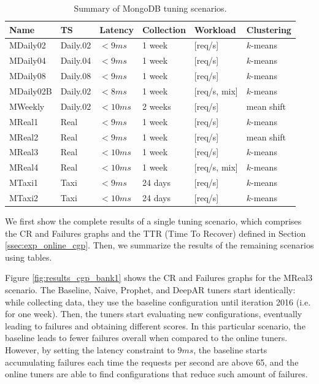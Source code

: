 \documentclass[a4paper, 12pt]{article} %
\newcommand{\ra}[1]{\renewcommand{\arraystretch}{#1}}
\begin{document}
	\begin{table}\centering 
		\ra{1.3}
		\begin{tabularx}{\textwidth}{@{}llllXX@{}}
			\midrule
			Name & TS & Latency & Collection & Workload & Clustering\\
			\midrule
			MDaily02&Daily.02 & $<9ms$  & 1 week & [req/s]  & $k$-means\\
			MDaily04&Daily.04 & $<9ms$  & 1 week & [req/s]  & $k$-means\\
			MDaily08&Daily.08 & $<9ms$  & 1 week & [req/s] & $k$-means\\
			MDaily02B&Daily.02 & $<8ms$  & 1 week & [req/s, mix] & $k$-means\\
			MWeekly&Daily.02 & $<10ms$  & 2 weeks & [req/s]  & mean shift\\
			MReal1&Real & $<9ms$  & 1 week & [req/s]  & $k$-means\\
			MReal2&Real & $<9ms$  & 1 week & [req/s]  & mean shift\\
			MReal3&Real & $<10ms$  & 1 week & [req/s]  & $k$-means\\
			MReal4&Real & $<10ms$  & 1 week & [req/s, mix]  & $k$-means\\
			MTaxi1 &Taxi & $<9ms$  & 24 days & [req/s]  & $k$-means\\
			MTaxi2 &Taxi & $<10ms$  & 24 days & [req/s]  & $k$-means\\
			
			\bottomrule
		\end{tabularx}
	\caption{Summary of MongoDB tuning scenarios. }  \label{table:results_tuning_scenarios}
	\end{table}
	
	We first show the complete results of a single tuning scenario, which comprises the CR and Failures graphs and the TTR (Time To Recover) defined in Section \ref{ssec:exp_online_cgp}. Then, we summarize the results of the remaining scenarios using tables.
	
	Figure \ref{fig:results_cgp_bank1} shows the CR and Failures graphs for the MReal3 scenario. The Baseline, Naive, Prophet, and DeepAR tuners start identically: while collecting data, they use the baseline configuration until iteration 2016 (i.e. for one week). Then, the tuners start evaluating new configurations, eventually leading to failures and obtaining different scores. In this particular scenario, the baseline leads to fewer failures overall when compared to the online tuners. However, by setting the latency constraint to $9ms$, the baseline starts accumulating failures each time the requests per second are above 65, and the online tuners are able to find configurations that reduce such amount of failures. 
	 
\end{document}
